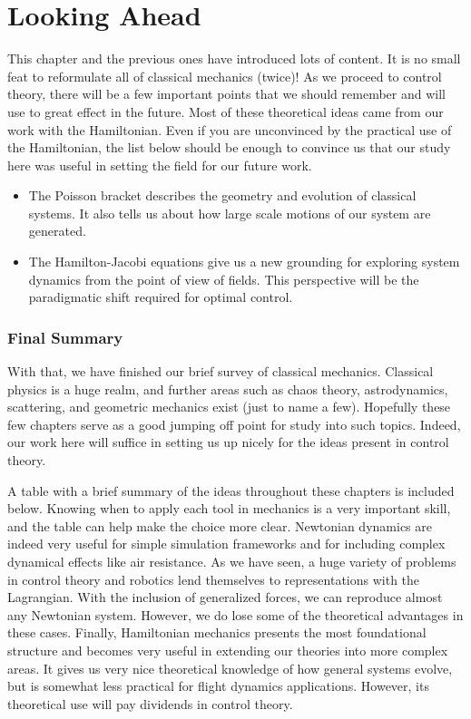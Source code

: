 \section{Looking Ahead}
This chapter and the previous ones have introduced lots of content. It is no small feat to reformulate all of classical mechanics (twice)! As we proceed to control theory, there will be a few important points that we should remember and will use to great effect in the future. Most of these theoretical ideas came from our work with the \gls{Hamiltonian}. Even if you are unconvinced by the practical use of the \gls{Hamiltonian}, the list below should be enough to convince us that our study here was useful in setting the field for our future work.
\begin{itemize}
    \item The Poisson bracket describes the geometry and evolution of classical systems. It also tells us about how large scale motions of our system are generated.
    \item The Hamilton-Jacobi equations give us a new grounding for exploring system dynamics from the point of view of fields. This perspective will be the paradigmatic shift required for optimal control.
\end{itemize}

\subsubsection{Final Summary}
With that, we have finished our brief survey of classical mechanics. Classical physics is a huge realm, and further areas such as chaos theory, astrodynamics, scattering, and geometric mechanics exist (just to name a few). Hopefully these few chapters serve as a good jumping off point for study into such topics. Indeed, our work here will suffice in setting us up nicely for the ideas present in control theory.

A table with a brief summary of the ideas throughout these chapters is included below. Knowing when to apply each tool in mechanics is a very important skill, and the table can help make the choice more clear. Newtonian dynamics are indeed very useful for simple simulation frameworks and for including complex dynamical effects like air resistance. As we have seen, a huge variety of problems in control theory and robotics lend themselves to representations with the \gls{Lagrangian}. With the inclusion of generalized forces, we can reproduce almost any Newtonian system. However, we do lose some of the theoretical advantages in these cases. Finally, \gls{Hamiltonian} mechanics presents the most foundational structure and becomes very useful in extending our theories into more complex areas. It gives us very nice theoretical knowledge of how general systems evolve, but is somewhat less practical for flight dynamics applications. However, its theoretical use will pay dividends in control theory.

